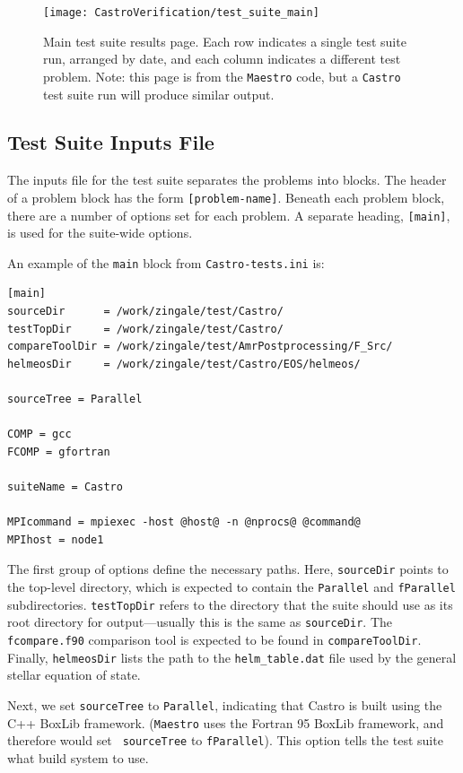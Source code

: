 \begin{figure}[t]
\centering
\texttt{[image: CastroVerification/test\_suite\_main]}
\caption{\label{fig:test_suite_main} Main test suite results page.  Each 
row indicates a single test suite run, arranged by date, and each column
indicates a different test problem.  Note: this page is from the {\tt Maestro}
code, but a {\tt Castro} test suite run will produce similar output.}
\end{figure}

\subsection{Test Suite Inputs File}

The inputs file for the test suite separates the problems into blocks.
The header of a problem block has the form {\tt [problem-name]}.
Beneath each problem block, there are a number of options set for each
problem.  A separate heading, {\tt [main]}, is used for the suite-wide
options.

An example of the {\tt main} block from {\tt Castro-tests.ini} is:
\begin{verbatim}
[main]
sourceDir      = /work/zingale/test/Castro/
testTopDir     = /work/zingale/test/Castro/
compareToolDir = /work/zingale/test/AmrPostprocessing/F_Src/
helmeosDir     = /work/zingale/test/Castro/EOS/helmeos/

sourceTree = Parallel

COMP = gcc
FCOMP = gfortran

suiteName = Castro

MPIcommand = mpiexec -host @host@ -n @nprocs@ @command@
MPIhost = node1
\end{verbatim}

The first group of options define the necessary paths.
Here, {\tt sourceDir} points to the top-level directory, which is
expected to contain the {\tt Parallel} and {\tt fParallel} subdirectories.
{\tt testTopDir} refers to the directory that the suite should use as
its root directory for output---usually this is the same as {\tt sourceDir}.
The {\tt fcompare.f90} comparison tool is expected to be found in
{\tt compareToolDir}.  Finally, {\tt helmeosDir} lists the path to the
{\tt helm\_table.dat} file used by the general stellar equation of state.

Next, we set {\tt sourceTree} to {\tt Parallel}, indicating that
Castro is built using the C++ BoxLib framework.  ({\tt Maestro} uses
the Fortran 95 BoxLib framework, and therefore would set {\tt
  sourceTree} to {\tt fParallel}).  This option tells the test suite
what build system to use.

